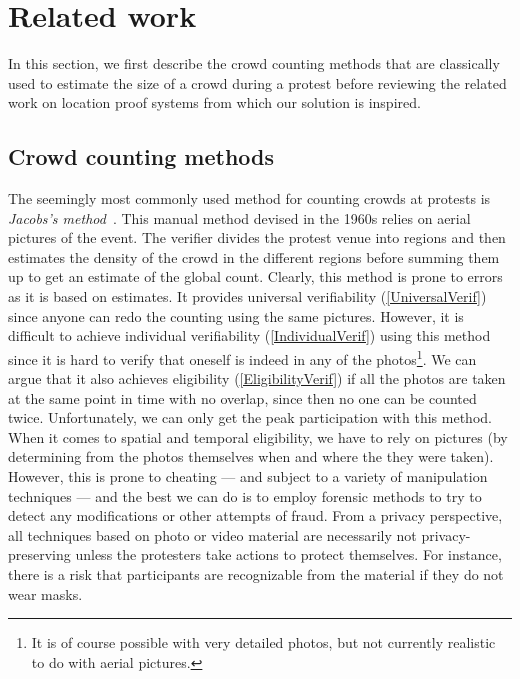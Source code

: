\section{Related work}%
\label{RelatedWork}

In this section, we first describe the crowd counting methods that are classically used to estimate the size of a crowd during a protest before reviewing the related work on location proof systems from which our solution \PRIVO is inspired.  

\subsection{Crowd counting methods}

The seemingly most commonly used method for counting crowds at protests is \emph{Jacobs's method}~\cite{2016DemonstrationsInSeoul,BBCHowToCountProtestNumbers,HowWillWeKnowTrumpInauguralCrowdSize,TheXManMarch,TheCrowdNumbersGame}.
This manual method devised in the 1960s relies on aerial pictures of the event.
The verifier divides the protest venue into regions and then estimates the density of the crowd in the different regions before summing them up to get an estimate of the global count.
Clearly, this method is prone to errors as it is based on estimates.
It provides universal verifiability (\cref{UniversalVerif}) since anyone can redo the counting using the same pictures.
However, it is difficult to achieve individual verifiability (\cref{IndividualVerif}) using this method since it is hard to verify that oneself is indeed in any of the photos\footnote{It is of course possible with very detailed photos, but not currently realistic to do with aerial pictures.}.
We can argue that it also achieves eligibility (\cref{EligibilityVerif}) if all the photos are taken at the same point in time with no overlap, since then no one can be counted twice.
Unfortunately, we can only get the peak participation with this method.
When it comes to spatial and temporal eligibility, we have to rely on pictures (\eg by determining from the photos themselves when and where the they were taken).
However, this is prone to cheating --- and subject to a variety of manipulation techniques --- and the best we can do is to employ forensic methods to try to detect any modifications or other attempts of fraud.
From a privacy perspective, all techniques based on photo or video material are necessarily not privacy-preserving unless the protesters take actions to protect themselves.
For instance, there is a risk that participants are recognizable from the material if they do not wear masks.

